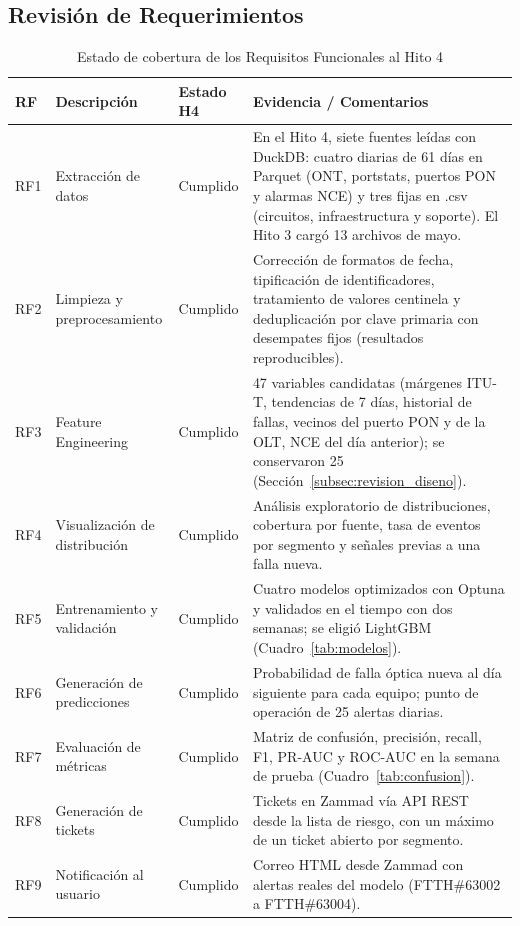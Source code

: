 \documentclass[12pt,a4paper]{article}
\begin{document}
\subsection{Revisión de Requerimientos}

\begin{table}[H]
\centering
\small 
\renewcommand{\arraystretch}{1.3}
\begin{tabular}{|p{1.1cm}|p{2.9cm}|p{1.9cm}|p{7.2cm}|}
\hline
\textbf{RF} & \textbf{Descripción} & \textbf{Estado H4} & \textbf{Evidencia / Comentarios} \\
\hline
RF1 & Extracción de datos & Cumplido & En el Hito 4, siete fuentes leídas con DuckDB: cuatro diarias de 61 días en Parquet (ONT, portstats, puertos PON y alarmas NCE) y tres fijas en .csv (circuitos, infraestructura y soporte). El Hito 3 cargó 13 archivos de mayo. \\
\hline
RF2 & Limpieza y preprocesamiento & Cumplido & Corrección de formatos de fecha, tipificación de identificadores, tratamiento de valores centinela y deduplicación por clave primaria con desempates fijos (resultados reproducibles). \\
\hline
RF3 & Feature Engineering & Cumplido & 47 variables candidatas (márgenes ITU-T, tendencias de 7 días, historial de fallas, vecinos del puerto PON y de la OLT, NCE del día anterior); se conservaron 25 (Sección~\ref{subsec:revision_diseno}). \\
\hline
RF4 & Visualización de distribución & Cumplido & Análisis exploratorio de distribuciones, cobertura por fuente, tasa de eventos por segmento y señales previas a una falla nueva. \\
\hline
RF5 & Entrenamiento y validación & Cumplido & Cuatro modelos optimizados con Optuna y validados en el tiempo con dos semanas; se eligió LightGBM (Cuadro~\ref{tab:modelos}). \\
\hline
RF6 & Generación de predicciones & Cumplido & Probabilidad de falla óptica nueva al día siguiente para cada equipo; punto de operación de 25 alertas diarias. \\
\hline
RF7 & Evaluación de métricas & Cumplido & Matriz de confusión, precisión, recall, F1, PR-AUC y ROC-AUC en la semana de prueba (Cuadro~\ref{tab:confusion}). \\
\hline
RF8 & Generación de tickets & Cumplido & Tickets en Zammad vía API REST desde la lista de riesgo, con un máximo de un ticket abierto por segmento. \\
\hline
RF9 & Notificación al usuario & Cumplido & Correo HTML desde Zammad con alertas reales del modelo (FTTH\#63002 a FTTH\#63004). \\
\hline
\end{tabular}
\caption{Estado de cobertura de los Requisitos Funcionales al Hito 4}
\label{tab:cobertura-rf}
\end{table}
\end{document}
